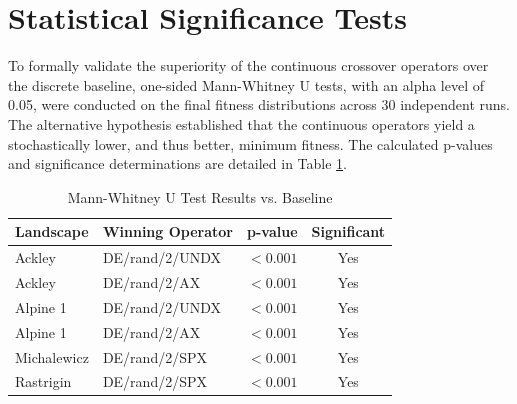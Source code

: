 \documentclass[conference]{IEEEtran}
\begin{document}
\section{Statistical Significance Tests}
\label{sec:stat_sig_tests}
To formally validate the superiority of the continuous crossover operators over the discrete baseline, 
one-sided Mann-Whitney U tests, with an alpha level of 0.05, were conducted on the final fitness 
distributions across 30 independent runs. The alternative hypothesis established that the continuous 
operators yield a stochastically lower, and thus better, minimum fitness. The calculated p-values and 
significance determinations are detailed in Table \ref{tab:p_values}.
\begin{table}[H]
    \caption{Mann-Whitney U Test Results vs. Baseline}
    \label{tab:p_values}
    \centering
    \begin{tabular}{llcc}
        \toprule
        \textbf{Landscape} & \textbf{Winning Operator} & \textbf{p-value} & \textbf{Significant} \\
        \midrule
        Ackley & DE/rand/2/UNDX & $< 0.001$ & Yes \\
        Ackley & DE/rand/2/AX & $< 0.001$ & Yes \\
        Alpine 1 & DE/rand/2/UNDX & $< 0.001$ & Yes \\
        Alpine 1 & DE/rand/2/AX & $< 0.001$ & Yes \\
        Michalewicz & DE/rand/2/SPX & $< 0.001$ & Yes \\
        Rastrigin & DE/rand/2/SPX & $< 0.001$ & Yes \\
        \bottomrule
    \end{tabular}
\end{table}
\end{document}
